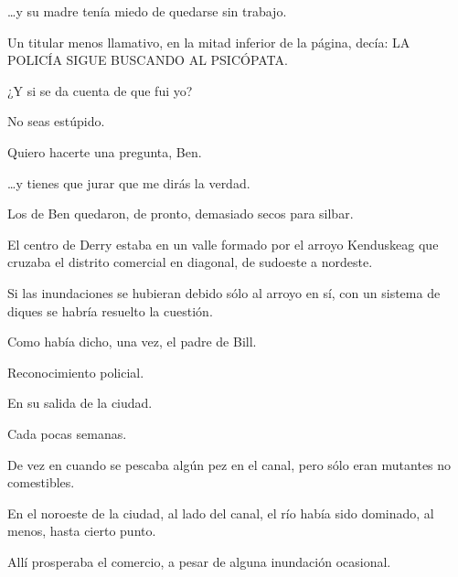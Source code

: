 \sk
\ldots{}y su madre tenía miedo de quedarse sin trabajo.

\sk
Un titular menos llamativo, en la mitad inferior
de la página, decía: LA POLICÍA SIGUE
BUSCANDO AL PSICÓPATA.

\sk
¿Y si se da cuenta de que fui yo?

\sk
No seas estúpido. 

\sk
Quiero hacerte una pregunta, Ben.

\sk
\ldots{}y tienes que jurar que me dirás la verdad.

\sk
Los de Ben quedaron, de pronto, demasiado
secos para silbar.

\sk
El centro de Derry estaba en un valle formado por el
arroyo Kenduskeag que cruzaba el distrito
comercial en diagonal, de sudoeste a nordeste.

\sk
Si las inundaciones se
hubieran debido sólo al arroyo en sí, con un
sistema de diques se habría resuelto la cuestión.

\sk
Como había dicho, una vez, el padre de Bill.

\sk
Reconocimiento policial. 

\sk
En su salida de la ciudad. 

\sk
Cada pocas semanas. 

\sk
De vez en cuando se pescaba algún pez en el canal, pero
sólo eran mutantes no comestibles.

\sk
En el noroeste de la ciudad, al lado del canal, el
río había sido dominado, al menos, hasta cierto punto.

\sk
Allí prosperaba el comercio, a pesar de
alguna inundación ocasional.

